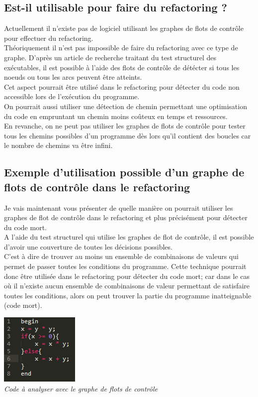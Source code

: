 \documentclass[a4paper,twoside,12pt,openright]{report}
\begin{document}
\subsection{Est-il utilisable pour faire du refactoring ?}
Actuellement il n'existe pas de logiciel utilisant les graphes de flots de contrôle pour effectuer du refactoring.\\
Théoriquement il n'est pas impossible de faire du refactoring avec ce type de graphe.
D'après un article de recherche traitant du test structurel des exécutables, il est possible à l'aide des flots de contrôle de détécter si tous les noeuds ou tous les arcs peuvent être atteints\cite{ref12}.\\
Cet aspect pourrait être utilisé dans le refactoring pour détecter du code non accessible lors de l'exécution du programme.\\
On pourrait aussi utiliser une détection de chemin
permettant une optimisation du code en empruntant un chemin moins coûteux en temps et ressources.\\
En revanche, on ne peut pas utiliser les graphes de flots de contrôle pour tester tous les chemins possibles d'un programme dès lors qu'il contient des boucles car le nombre de chemins va être infini.\\

\subsection{Exemple d'utilisation possible d'un graphe de flots de contrôle dans le refactoring}

Je vais maintenant vous présenter de quelle manière on pourrait utiliser les graphes de flot de contrôle dans le refactoring et plus précisément pour détecter du code mort.\\
A l'aide du test structurel qui utilise les graphes de flot de contrôle, il est possible d'avoir une couverture de toutes les décisions possibles\cite{ref13}.\\
C'est à dire de trouver au moins un ensemble de combinaisons de valeurs qui permet de passer toutes les conditions du programme. Cette technique pourrait donc être utilisée dans le refactoring pour détecter du code mort; car dans le cas où il n'existe aucun ensemble de combinaisons de valeur permettant de satisfaire toutes les conditions, alors on peut trouver la partie du programme inatteignable (code mort).\\

\begin{center}
\includegraphics[scale=1.5]{Image/ExempleCodeGraphe.png}\\
\itshape{Code à analyser avec le graphe de flots de contrôle}
\end{center}
\end{document}
